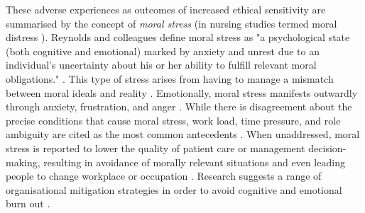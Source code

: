 These adverse experiences as outcomes of increased ethical sensitivity are summarised by the concept of \textit{moral stress} \cite{reynolds2015recognition} (in nursing studies termed moral distress \cite{morley2019moraldistress, Lutzen2012Moraldistress, imbulana2021interventions}). Reynolds and colleagues define moral stress as "a psychological state (both cognitive and emotional) marked by anxiety and unrest due to an individual’s uncertainty about his or her ability to fulﬁll relevant moral obligations." \cite{reynolds2012moral}.
This type of stress arises from having to manage a mismatch between moral ideals and reality \cite{reynolds2012moral,reynolds2015recognition}. Emotionally, moral stress manifests outwardly through anxiety, frustration, and anger \cite{Lutzen2012Moraldistress}.
While there is disagreement about the precise conditions that cause moral stress, work load, time pressure, and role ambiguity are cited as the most common antecedents \cite{imbulana2021interventions,morley2019moraldistress}. When unaddressed, moral stress is reported to lower the quality of patient care or management decision-making, resulting in avoidance of morally relevant situations and even leading people to change workplace or occupation \cite{morley2019moraldistress}. Research suggests a range of organisational mitigation strategies in order to avoid cognitive and emotional burn out \cite{reynolds2015recognition}.

